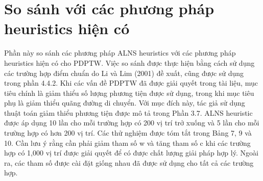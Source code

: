 \section{So sánh với các phương pháp heuristics hiện có}
Phần này so sánh các phương pháp ALNS heuristics với các phương pháp heuristics hiện có cho PDPTW. Việc so sánh được thực hiện bằng cách sử dụng các trường hợp điểm chuẩn do Li và Lim (2001) đề xuất, cũng được sử dụng trong phần 4.4.2. Khi các vấn đề PDPTW đã được giải quyết trong tài liệu, mục tiêu chính là giảm thiểu số lượng phương tiện được sử dụng, trong khi mục tiêu phụ là giảm thiểu quãng đường di chuyển. Với mục đích này, tác giả sử dụng thuật toán giảm thiểu phương tiện được mô tả trong Phần 3.7. ALNS heuristic được áp dụng 10 lần cho mỗi trường hợp có 200 vị trí trở xuống và 5 lần cho mỗi trường hợp có hơn 200 vị trí. Các thử nghiệm được tóm tắt trong Bảng 7, 9 và 10. Cần lưu ý rằng cần phải giảm tham số w và tăng tham số c khi các trường hợp có 1,000 vị trí được giải quyết để có được chất lượng giải pháp hợp lý. Ngoài ra, các tham số được cài đặt giống nhau đã được sử dụng cho tất cả các trường hợp.


